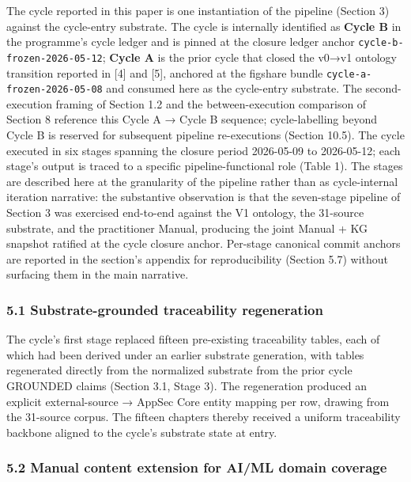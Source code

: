 \documentclass[
]{article}
\begin{document}
The cycle reported in this paper is one instantiation of the pipeline
(Section 3) against the cycle-entry substrate. The cycle is internally
identified as \textbf{Cycle B} in the programme's cycle ledger and is
pinned at the closure ledger anchor \texttt{cycle-b-frozen-2026-05-12};
\textbf{Cycle A} is the prior cycle that closed the v0→v1 ontology
transition reported in {[}4{]} and {[}5{]}, anchored at the figshare
bundle \texttt{cycle-a-frozen-2026-05-08} and consumed here as the
cycle-entry substrate. The second-execution framing of Section 1.2 and
the between-execution comparison of Section 8 reference this Cycle A →
Cycle B sequence; cycle-labelling beyond Cycle B is reserved for
subsequent pipeline re-executions (Section 10.5). The cycle executed in
six stages spanning the closure period 2026-05-09 to 2026-05-12; each
stage's output is traced to a specific pipeline-functional role (Table
1). The stages are described here at the granularity of the pipeline
rather than as cycle-internal iteration narrative: the substantive
observation is that the seven-stage pipeline of Section 3 was exercised
end-to-end against the V1 ontology, the 31-source substrate, and the
practitioner Manual, producing the joint Manual + KG snapshot ratified
at the cycle closure anchor. Per-stage canonical commit anchors are
reported in the section's appendix for reproducibility (Section 5.7)
without surfacing them in the main narrative.

\subsubsection{5.1 Substrate-grounded traceability
regeneration}\label{substrate-grounded-traceability-regeneration}

The cycle's first stage replaced fifteen pre-existing traceability
tables, each of which had been derived under an earlier substrate
generation, with tables regenerated directly from the normalized
substrate from the prior cycle GROUNDED claims (Section 3.1, Stage 3).
The regeneration produced an explicit external-source → AppSec Core
entity mapping per row, drawing from the 31-source corpus. The fifteen
chapters thereby received a uniform traceability backbone aligned to the
cycle's substrate state at entry.

\subsubsection{5.2 Manual content extension for AI/ML domain
coverage}\label{manual-content-extension-for-aiml-domain-coverage}
\end{document}
